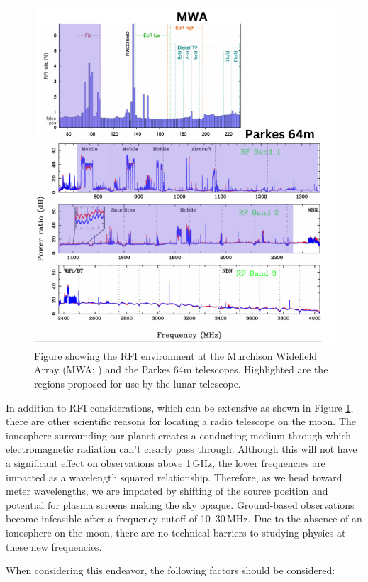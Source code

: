 \begin{figure}
    \centering
    \includegraphics[width=0.75\linewidth]{figures/RFI_Plot.png}
    \caption{Figure showing the RFI environment at the Murchison Widefield Array (MWA; \citealt{Offringa_RFI}) and the Parkes 64m \citep{Hobbs_2020} telescopes. Highlighted are the regions proposed for use by the lunar telescope. }
    \label{fig:RFI}
\end{figure}

In addition to RFI considerations, which can be extensive as shown in Figure \ref{fig:RFI}, there are other scientific reasons for locating a radio telescope on the moon. The ionosphere surrounding our planet creates a conducting medium through which
electromagnetic radiation can't clearly pass through. Although this will not have a significant effect on observations above 1\,GHz, the lower frequencies are impacted as a wavelength squared relationship. Therefore, as we head toward meter wavelengths, we are impacted by shifting of the source position and potential for plasma screens making the sky opaque. Ground-based observations become infeasible after a frequency cutoff of 10--30\,MHz. Due to the absence of an ionosphere on the moon, there are no technical barriers to studying physics at these new frequencies.

When considering this endeavor, the following factors should be considered:

